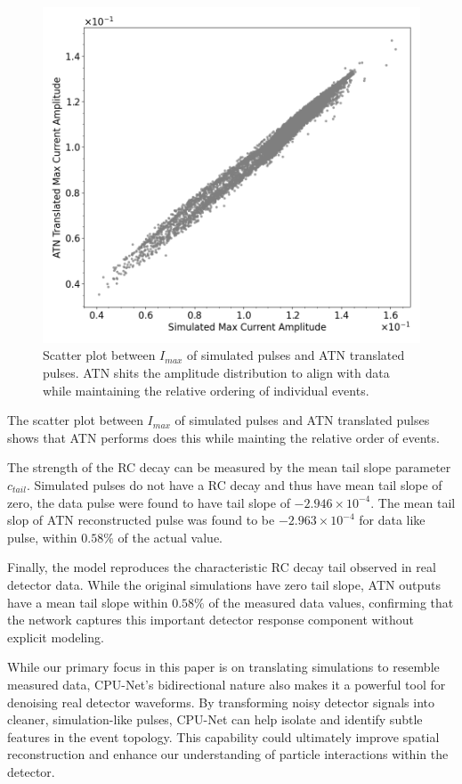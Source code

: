 \begin{figure}[htb!]
\centering
\includegraphics[width=0.8\linewidth,trim={0pc 0pc 0pc 0pc},clip]{ch8/figs/SEP_scatter_current_amplitude.png}
\caption{Scatter plot between $I_{max}$ of simulated pulses and ATN translated pulses. ATN shits the amplitude distribution to align with data while maintaining the relative ordering of individual events.}
\label{fig:current_amp}
\end{figure}




The scatter plot between $I_{max}$ of simulated pulses and ATN translated pulses shows that ATN performs does this while mainting the relative order of events.
   
The strength of the RC decay can be measured by the mean tail slope parameter $c_{tail}$. Simulated pulses do not have a RC decay and thus have mean tail slope of zero, the data pulse were found to have tail slope of $-2.946\times10^{-4}$. The mean tail slop of ATN reconstructed pulse was found to be $-2.963\times10^{-4}$ for data like pulse, within $0.58\%$ of the actual value.


Finally, the model reproduces the characteristic RC decay tail observed in real detector data. While the original simulations have zero tail slope, ATN outputs have a mean tail slope within $0.58\%$ of the measured data values, confirming that the network captures this important detector response component without explicit modeling. 

While our primary focus in this paper is on translating simulations to resemble measured data, CPU-Net’s bidirectional nature also makes it a powerful tool for denoising real detector waveforms. By transforming noisy detector signals into cleaner, simulation-like pulses, CPU-Net can help isolate and identify subtle features in the event topology. This capability could ultimately improve spatial reconstruction and enhance our understanding of particle interactions within the detector.

